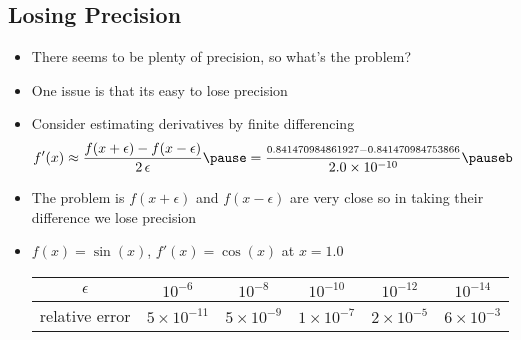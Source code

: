 
\begin{slide}
\section[-2]{Losing Precision}

\begin{PauseHighLight}
  \begin{itemize}
  \item There seems to be plenty of precision, so what's the problem?\pause
  \item One issue is that its easy to lose precision\pause
  \item Consider estimating derivatives by finite differencing
    \begin{align*}
      f'(x) \approx \frac{f(x+\epsilon) -
        f(x-\epsilon)}{2\,\epsilon}\pause
      = \frac{\scriptstyle 0.841470984861927-0.841470984753866}
      {2.0\times 10^{-10}}\pauseb
    \end{align*}
  \item The problem is $f(x+\epsilon)$ and $f(x-\epsilon)$ are very
    close so in taking their difference we lose precision\pause
  \item $f(x) = \sin(x)$, $f'(x) = \cos(x)$ at $x=1.0$
    \begin{center}\small
      \begin{tabular}{|c|c|c|c|c|c|}\hline
        $\epsilon$ & $10^{-6}$ & $10^{-8}$ & $10^{-10}$ & $10^{-12}$ & $10^{-14}$  \\ \hline
        relative error & $5\times 10^{-11}$ & $5\times10^{-9}$ &
        $1\times 10^{-7}$ & $2\times10^{-5}$ &$ 6\times10^{-3}$ \\ \hline
      \end{tabular}\pause
    \end{center}
  \end{itemize}
\end{PauseHighLight}

\end{slide}



